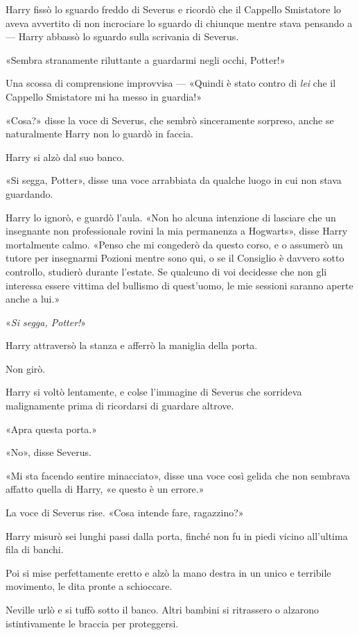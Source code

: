 Harry fissò lo sguardo freddo di Severus e ricordò che il Cappello Smistatore lo aveva avvertito di non incrociare lo sguardo di chiunque mentre stava pensando a — Harry abbassò lo sguardo sulla scrivania di Severus.

«Sembra stranamente riluttante a guardarmi negli occhi, Potter!»

Una scossa di comprensione improvvisa — «Quindi è stato contro di \textit{lei} che il Cappello Smistatore mi ha messo in guardia!»

«Cosa?» disse la voce di Severus, che sembrò sinceramente sorpreso, anche se naturalmente Harry non lo guardò in faccia.

Harry si alzò dal suo banco.

«Si segga, Potter», disse una voce arrabbiata da qualche luogo in cui non stava guardando.

Harry lo ignorò, e guardò l’aula. «Non ho alcuna intenzione di lasciare che un insegnante non professionale rovini la mia permanenza a Hogwarts», disse Harry mortalmente calmo. «Penso che mi congederò da questo corso, e o assumerò un tutore per insegnarmi Pozioni mentre sono qui, o se il Consiglio è davvero sotto controllo, studierò durante l’estate. Se qualcuno di voi decidesse che non gli interessa essere vittima del bullismo di quest’uomo, le mie sessioni saranno aperte anche a lui.»

«\textit{Si segga, Potter!}»

Harry attraversò la stanza e afferrò la maniglia della porta.

Non girò.

Harry si voltò lentamente, e colse l’immagine di Severus che sorrideva malignamente prima di ricordarsi di guardare altrove.

«Apra questa porta.»

«No», disse Severus.

«Mi sta facendo sentire minacciato», disse una voce così gelida che non sembrava affatto quella di Harry, «e questo è un errore.»

La voce di Severus rise. «Cosa intende fare, ragazzino?»

Harry misurò sei lunghi passi dalla porta, finché non fu in piedi vicino all’ultima fila di banchi.

Poi si mise perfettamente eretto e alzò la mano destra in un unico e terribile movimento, le dita pronte a schioccare.

Neville urlò e si tuffò sotto il banco. Altri bambini si ritrassero o alzarono istintivamente le braccia per proteggersi.

